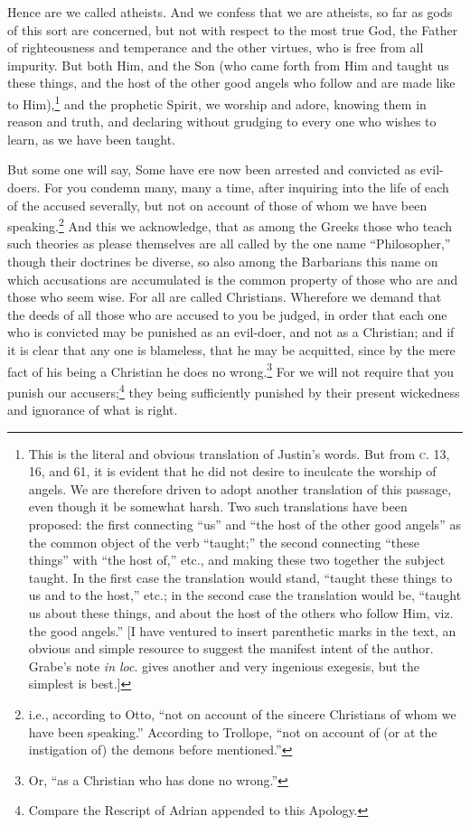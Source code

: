 
Hence are we called atheists. And we confess that we are atheists, so far as gods of this sort are concerned, but not with respect to the most true God, the Father of righteousness and temperance and the other virtues, who is free from all impurity. But both Him, and the Son (who came forth from Him and taught us these things, and the host of the other good angels who follow and are made like to Him),\footnote{This is the literal and obvious translation of Justin’s words. But from \textsc{c}. 13, 16, and 61, it is evident that he did not desire to inculcate the worship of angels. We are therefore driven to adopt another translation of this passage, even though it be somewhat harsh. Two such translations have been proposed: the first connecting “us” and “the host of the other good angels” as the common object of the verb “taught;” the second connecting “these things” with “the host of,” etc., and making these two together the subject taught. In the first case the translation would stand, “taught these things to us and to the host,” etc.; in the second case the translation would be, “taught us about these things, and about the host of the others who follow Him, viz. the good angels.” [I have ventured to insert parenthetic marks in the text, an obvious and simple resource to suggest the manifest intent of the author. Grabe’s note \emph{in loc}. gives another and very ingenious exegesis, but the simplest is best.]} and the prophetic Spirit, we worship and adore, knowing them in reason and truth, and declaring without grudging to every one who wishes to learn, as we have been taught.


But some one will say, Some have ere now been arrested and convicted as evil-doers. For  you condemn many, many a time, after inquiring into the life of each of the accused severally, but not on account of those of whom we have been speaking.\footnote{i.e., according to Otto, “not on account of the sincere Christians of whom we have been speaking.” According to Trollope, “not on account of (or at the instigation of) the demons before mentioned.”} And this we acknowledge, that as among the Greeks those who teach such theories as please themselves are all called by the one name “Philosopher,” though their doctrines be diverse, so also among the Barbarians this name on which accusations are accumulated is the common property of those who are and those who seem wise. For all are called Christians. Wherefore we demand that the deeds of all those who are accused to you be judged, in order that each one who is convicted may be punished as an evil-doer, and not as a Christian; and if it is clear that any one is blameless, that he may be acquitted, since by the mere fact of his being a Christian he does no wrong.\footnote{Or, “as a Christian who has done no wrong.”} For we will not require that you punish our accusers;\footnote{Compare the Rescript of Adrian appended to this Apology.} they being sufficiently punished by their present wickedness and ignorance of what is right.

